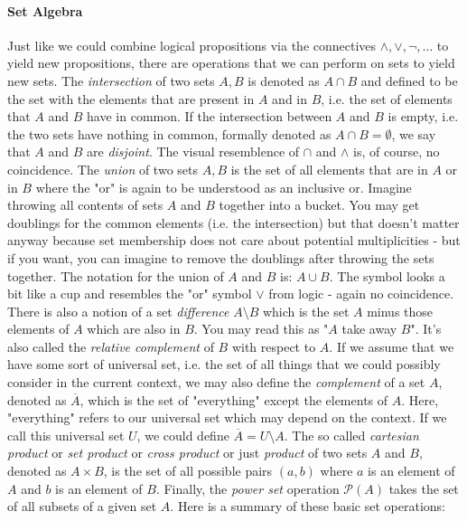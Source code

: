 \paragraph{Set Algebra} \label{Par:SetAlgebra} Just like we could combine logical propositions via the connectives $\wedge, \vee, \neg, \ldots$ to yield new propositions, there are operations that we can perform on sets to yield new sets. The \emph{intersection} of two sets $A, B$ is denoted as $A \cap B$ and defined to be the set with the elements that are present in $A$ and in $B$, i.e. the set of elements that $A$ and $B$ have in common. If the intersection between $A$ and $B$ is empty, i.e. the two sets have nothing in common, formally denoted as $A \cap B = \emptyset$, we say that $A$ and $B$ are \emph{disjoint}. The visual resemblence of $\cap$ and $\wedge$ is, of course, no coincidence. The \emph{union} of two sets $A,B$ is the set of all elements that are in $A$ or in $B$ where the "or" is again to be understood as an inclusive or. Imagine throwing all contents of sets $A$ and $B$ together into a bucket. You may get doublings for the common elements (i.e. the intersection) but that doesn't matter anyway because set membership does not care about potential multiplicities - but if you want, you can imagine to remove the doublings after throwing the sets together. The notation for the union of $A$ and $B$ is: $A \cup B$. The symbol looks a bit like a cup and resembles the "or" symbol $\vee$ from logic - again no coincidence. There is also a notion of a set \emph{difference} $A \setminus B$ which is the set $A$ minus those elements of $A$ which are also in $B$. You may read this as "$A$ take away $B$". It's also called the \emph{relative complement} of $B$ with respect to $A$. If we assume that we have some sort of universal set, i.e. the set of all things that we could possibly consider in the current context, we may also define the \emph{complement} of a set $A$, denoted as $\overline{A}$, which is the set of "everything" except the elements of $A$. Here, "everything" refers to our universal set which may depend on the context. If we call this universal set $U$, we could define $\overline{A} = U \setminus A$. The so called \emph{cartesian product} or \emph{set product} or \emph{cross product} or just \emph{product} of two sets $A$ and $B$, denoted as $A \times B$, is the set of all possible pairs $(a,b)$ where $a$ is an element of $A$ and $b$ is an element of $B$. Finally, the \emph{power set} operation $\mathcal{P}(A)$ takes the set of all subsets of a given set $A$. Here is a summary of these basic set operations:
